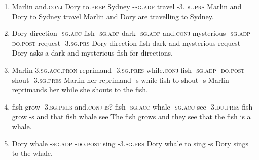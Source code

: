 \begin{enumerate}
\item
{}
{Marlin and.\textsc{conj} Dory to.\textsc{prep} Sydney -\textsc{sg.adp} travel -\textsc{3.du.prs}}
{Marlin and Dory to Sydney {} travel {}}
{Marlin and Dory are travelling to Sydney.}

\item
{}
{Dory direction -\textsc{sg.acc} fish -\textsc{sg.adp} dark -\textsc{sg.adp} and.\textsc{conj} mysterious -\textsc{sg.adp} -\textsc{do.post} request -\textsc{3.sg.prs}}
{Dory direction {} fish {} dark {} and mysterious {} {} request {}}
{Dory asks a dark and mysterious fish for directions.}

\item
{}
{Marlin \textsc{3.sg.acc.pron} reprimand -\textsc{3.sg.pres} while.\textsc{conj} fish -\textsc{sg.adp} -\textsc{do.post} shout -\textsc{3.sg.pres}}
{Marlin her reprimand -s while fish {} to shout -s}
{Marlin reprimands her while she shouts to the fish.}

\item
{}
{fish grow -\textsc{3.sg.pres} and.\textsc{conj} \textsc{is?} fish -\textsc{sg.acc} whale -\textsc{sg.acc} see -\textsc{3.du.pres}}
{fish grow -s and that fish {} whale {} see {}}
{The fish grows and they see that the fish is a whale.}

\item
{}
{Dory whale -\textsc{sg.adp} -\textsc{do.post} sing -\textsc{3.sg.prs}}
{Dory whale {} to sing -s}
{Dory sings to the whale.}


\end{enumerate}

